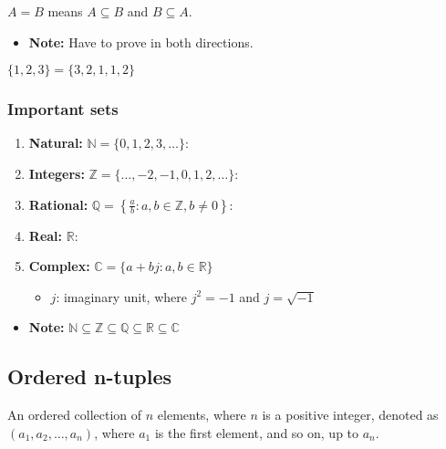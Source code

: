 \begin{theorem}
    $A = B$ means $A \subseteq B$ and $B \subseteq A$.
    \begin{itemize}
        \item \textbf{Note:} Have to prove in both directions.
    \end{itemize}
\end{theorem}

\begin{example}
    $\{1,2,3\}=\{3,2,1,1,2\}$
\end{example}

    \subsubsection{Important sets}
    \begin{definition}
        \begin{enumerate}
            \item \textbf{Natural:} \( \mathbb{N} = \{0, 1, 2, 3, \dots \} \): 
            \item \textbf{Integers:} \( \mathbb{Z} = \{ \dots, -2, -1, 0, 1, 2, \dots \} \): 
            \item \textbf{Rational:} \( \mathbb{Q} = \left\{ \frac{a}{b} : a, b \in \mathbb{Z}, b \neq 0 \right\} \): 
            \item \textbf{Real:} \( \mathbb{R} \): 
            \item \textbf{Complex:} \( \mathbb{C} = \{ a + bj : a, b \in \mathbb{R} \} \)
            \begin{itemize}
                \item \( j \): imaginary unit, where \( j^2 = -1 \) and \( j = \sqrt{-1} \)
            \end{itemize}
        \end{enumerate}  
        \begin{itemize}
            \item \textbf{Note:} $\mathbb{N} \subseteq \mathbb{Z} \subseteq \mathbb{Q} \subseteq \mathbb{R} \subseteq \mathbb{C} $
        \end{itemize}      
    \end{definition}

\subsection{Ordered n-tuples}
\begin{definition}
    An ordered collection of \( n \) elements, where \( n \) is a positive integer, denoted as \( (a_1, a_2, \dots, a_n) \), where \( a_1 \) is the first element, and so on, up to \( a_n \).
\end{definition}
    
